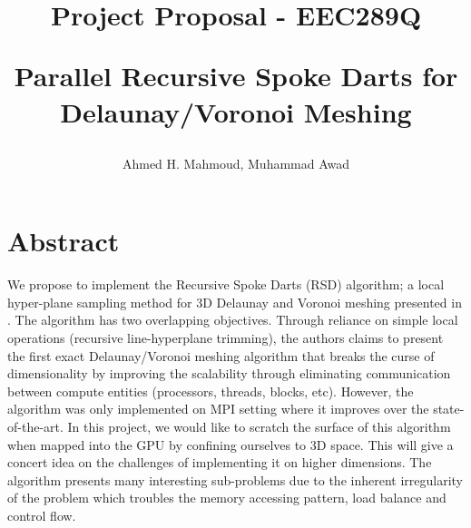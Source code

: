 \documentclass[12pt] {article}
\begin{document}

\title{
Project Proposal -  EEC289Q \\
\begin{large}
Parallel Recursive Spoke Darts for Delaunay/Voronoi Meshing
\end{large}
}
\author{Ahmed H. Mahmoud, Muhammad Awad}
\date{}
\maketitle



\section*{Abstract}
We propose to implement the Recursive Spoke Darts (RSD) algorithm; a local hyper-plane sampling method for 3D Delaunay and Voronoi meshing presented in \citep{EBEIDA2016110}. The algorithm has two overlapping objectives. Through reliance on simple local operations (recursive line-hyperplane trimming), the authors claims to present the first exact Delaunay/Voronoi meshing algorithm that breaks the curse of dimensionality by improving the scalability through eliminating communication between compute entities (processors, threads, blocks, etc). However, the algorithm was only implemented on MPI setting where it improves over the state-of-the-art. In this project, we would like to scratch the surface of this algorithm when mapped into the GPU by confining ourselves to 3D space. This will give a concert idea on the challenges of implementing it on higher dimensions. The algorithm presents many interesting sub-problems due to the inherent irregularity of the problem which troubles the memory accessing pattern, load balance and control flow. 
\end{document}
